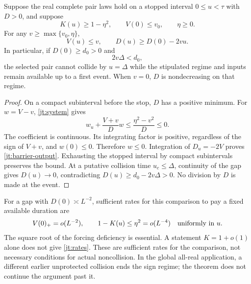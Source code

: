 \begin{theorem}
\label{jt:barrier}
Suppose the real complete pair laws hold on a stopped interval
$0\le u<\tau$ with $D>0$, and suppose
\begin{equation}
 K(u)\ge1-\eta^2,\qquad V(0)\le v_0,
 \qquad \eta\ge0.
 \label{jt:barrier-input}
\end{equation}
For any $v\ge\max\{v_0,\eta\}$,
\begin{equation}
 V(u)\le v,\qquad D(u)\ge D(0)-2vu.
 \label{jt:barrier-output}
\end{equation}
In particular, if $D(0)\ge d_0>0$ and
\begin{equation}
 2v\Delta<d_0,
 \label{jt:strict-margin}
\end{equation}
the selected pair cannot collide by $u=\Delta$ while the stipulated
regime and inputs remain available up to a first event. When $v=0$,
$D$ is nondecreasing on that regime.
\end{theorem}

\begin{proof}
On a compact subinterval before the stop, $D$ has a positive minimum.
For $w=V-v$, \eqref{jt:system} gives
\[
 w_u+\frac{V+v}{D}w
 \le\frac{\eta^2-v^2}{D}\le0.
\]
The coefficient is continuous. Its integrating factor is positive,
regardless of the sign of $V+v$, and $w(0)\le0$. Therefore $w\le0$.
Integration of $D_u=-2V$ proves \eqref{jt:barrier-output}.
Exhausting the stopped interval by compact subintervals preserves the
bound. At a putative collision time $u_c\le\Delta$, continuity of the
gap gives $D(u)\to0$, contradicting
$D(u)\ge d_0-2v\Delta>0$. No division by $D$ is made at the event.
\end{proof}

For a gap with $D(0)\asymp L^{-2}$, sufficient rates for this comparison
to pay a fixed available duration are
\begin{equation}
 V(0)_+=o(L^{-2}),\qquad
 1-K(u)\le\eta^2=o(L^{-4})\quad\hbox{uniformly in }u.
 \label{jt:rates}
\end{equation}
The square root of the forcing deficiency is essential. A statement
$K=1+o(1)$ alone does not give \eqref{jt:rates}. These are sufficient
rates for the comparison, not necessary conditions for actual
noncollision. In the global all-real application, a different earlier
unprotected collision ends the sign regime; the theorem does not
continue the argument past it.

